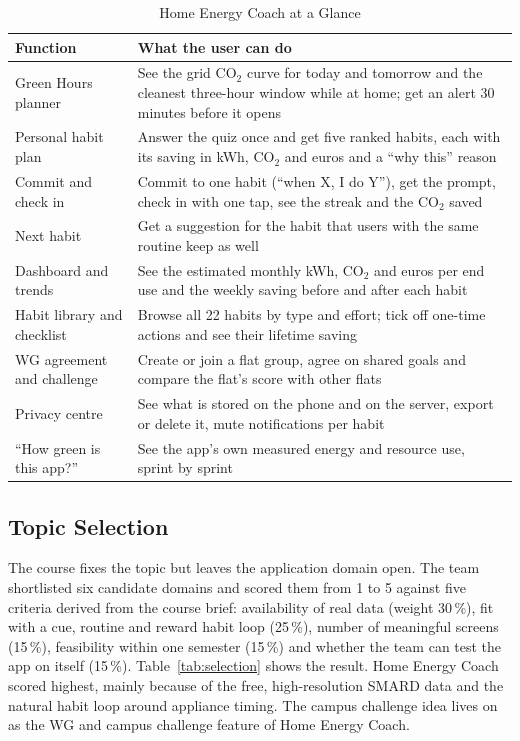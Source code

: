 \documentclass[conference]{IEEEtran}
\newcommand{\COtwo}{CO$_2$}
\begin{document}
\begin{table}[!t]
\caption{Home Energy Coach at a Glance}
\label{tab:features}
\centering
\footnotesize
\begin{tabular}{@{}L{2.0cm}L{6.25cm}@{}}
\toprule
Function & What the user can do \\
\midrule
Green Hours planner & See the grid \COtwo{} curve for today and tomorrow and the cleanest three-hour window while at home; get an alert 30 minutes before it opens \\
Personal habit plan & Answer the quiz once and get five ranked habits, each with its saving in kWh, \COtwo{} and euros and a ``why this'' reason \\
Commit and check in & Commit to one habit (``when X, I do Y''), get the prompt, check in with one tap, see the streak and the \COtwo{} saved \\
Next habit & Get a suggestion for the habit that users with the same routine keep as well \\
Dashboard and trends & See the estimated monthly kWh, \COtwo{} and euros per end use and the weekly saving before and after each habit \\
Habit library and checklist & Browse all 22 habits by type and effort; tick off one-time actions and see their lifetime saving \\
WG agreement and challenge & Create or join a flat group, agree on shared goals and compare the flat's score with other flats \\
Privacy centre & See what is stored on the phone and on the server, export or delete it, mute notifications per habit \\
``How green is this app?'' & See the app's own measured energy and resource use, sprint by sprint \\
\bottomrule
\end{tabular}
\end{table}

\subsection{Topic Selection}
The course fixes the topic but leaves the application domain open. The team shortlisted six candidate domains and scored them from 1 to 5 against five criteria derived from the course brief: availability of real data (weight 30\,\%), fit with a cue, routine and reward habit loop (25\,\%), number of meaningful screens (15\,\%), feasibility within one semester (15\,\%) and whether the team can test the app on itself (15\,\%). Table~\ref{tab:selection} shows the result. Home Energy Coach scored highest, mainly because of the free, high-resolution SMARD data and the natural habit loop around appliance timing. The campus challenge idea lives on as the WG and campus challenge feature of Home Energy Coach.
\end{document}
